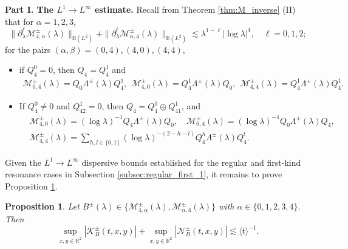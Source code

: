 \documentclass[reqno]{amsart}
\newtheorem{proposition}[theorem]{Proposition}
\numberwithin{equation}{section}
\begin{document}
\vspace{2mm}  
\textbf{Part I. The $L^1\to L^\infty$ estimate.}  
Recall from Theorem \ref{thm:M_inverse} (II) that for $\alpha = 1,2,3$,
\[
\|\partial_\lambda^\ell \mathcal{M}_{4,\alpha}^\pm(\lambda)\|_{\mathbb{B}(L^2)} + \|\partial_\lambda^\ell \mathcal{M}_{\alpha,4}^\pm(\lambda)\|_{\mathbb{B}(L^2)} \lesssim \lambda^{1-\ell}|\log \lambda|^{4}, \quad \ell = 0,1,2;
\]
for the pairs $(\alpha, \beta) = (0,4), (4,0), (4,4)$,
        \begin{itemize}
        \item if $Q_4^0 = 0$, then $Q_4 = Q_4^1$ and
        \begin{align}\label{Q4=Q41}
         \mathcal{M}_{0, 4}^\pm(\lambda) =  Q_0 \Lambda^\pm(\lambda) Q_4^1, \ \  \mathcal{M}_{4, 0}^\pm(\lambda) =  Q_4^1 \Lambda^\pm(\lambda) Q_0, \ \
         \mathcal{M}_{4,4}^\pm(\lambda) = Q_4^1 \Lambda^\pm(\lambda) Q_4^1.
        \end{align}
       
    \item If $Q_4^0 \neq 0$ and $Q_{42}^1 = 0$, then $Q_4 = Q_4^0 \oplus Q_{41}^1$, and
        \begin{align}
		& \mathcal{M}_{4,0}^\pm(\lambda)=(\log \lambda)^{-1}  Q_4 \Lambda^\pm(\lambda) Q_0,  \quad
          \mathcal{M}_{0,4}^\pm(\lambda)=(\log \lambda)^{-1}  Q_0 \Lambda^\pm(\lambda) Q_4, \nonumber   \\ \label{2-M4-4}
		& \mathcal{M}_{4,4}^\pm(\lambda) = \sum_{h,l\in\{0,1\}}(\log \lambda)^{-(2-h-l)} Q_4^h \Lambda^\pm(\lambda) Q_4^l.
        \end{align}
        \end{itemize}
Given the $L^1\to L^\infty$ dispersive bounds established for the regular and first-kind resonance cases in Subsection \ref{subsec:regular_first_1}, it remains to prove Proposition \ref{prop_second_2_1}.


\begin{proposition}\label{prop_second_2_1}
	Let $B^\pm(\lambda) \in \{\mathcal{M}_{4,\alpha}^{\pm}(\lambda), \mathcal{M}_{\alpha, 4}^{\pm}(\lambda)\}$ with $\alpha \in \{0,1,2,3,4\}$. Then
	\[  
\sup _{x, y \in \mathbb{R}^2}\left| \mathcal{K}_{B}^\pm(t,x,y)\right| + \sup _{x, y \in \mathbb{R}^2}\left|\mathcal{N}_{B}^\pm (t,x,y)\right| \lesssim \langle t\rangle^{-1}.  
	\]  
\end{proposition}
\end{document}
